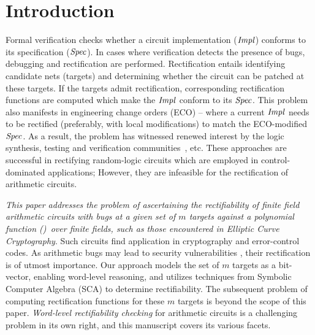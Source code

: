 \section{Introduction}\label{sec:intro}
Formal verification checks whether a circuit implementation
(${\it Impl}$) conforms to its specification (${\it Spec}$).  
In cases where verification detects the presence of bugs,
debugging and rectification are performed. Rectification entails
identifying candidate nets (targets) %
and determining whether the circuit can be patched at these 
targets. If the targets admit rectification,
corresponding rectification functions are computed which make 
the ${\it Impl}$ conform to its ${\it Spec}$.
This problem also manifests in engineering change orders (ECO) 
-- where a current ${\it Impl}$ needs to be
rectified (preferably, with local modifications) to match the ECO-modified
${\it Spec}$. As a result, the problem
has witnessed renewed interest by the logic synthesis, testing and verification
communities~\cite{MF_Huang:DATE12,SS_Fujita:ISCAS19,SS_Roland:DAC19},
etc. These approaches are successful in rectifying random-logic
circuits which are employed in control-dominated applications; 
However, they
are infeasible for the rectification of arithmetic circuits.

\par
{\it This paper addresses the problem of ascertaining the rectifiability 
of finite field arithmetic circuits with bugs at a given set of $m$ targets
against a polynomial function (\spec)~over finite fields, such as
those encountered in Elliptic Curve Cryptography}.
Such circuits find application in cryptography and error-control
codes. As arithmetic bugs may lead to security vulnerabilities
\cite{crypto:bug_attacks}, their rectification is of utmost
importance.
% 
Our approach models the set of $m$ targets as a bit-vector, enabling 
word-level reasoning, and utilizes techniques 
from Symbolic Computer Algebra (SCA) to determine rectifiability. 
The subsequent problem of computing rectification functions for these
$m$ targets is beyond the scope of this paper. {\it Word-level
  rectifiability checking} for arithmetic circuits is a challenging
problem in its own right, and this manuscript covers its various
facets. 
 
